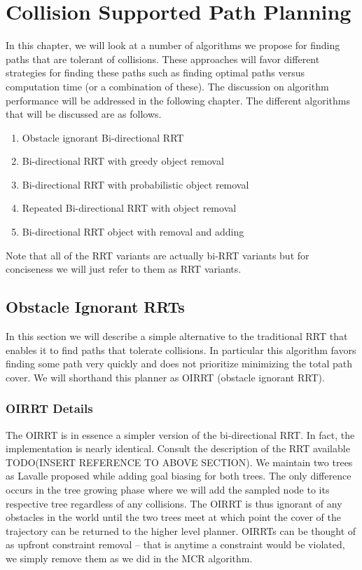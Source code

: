 \chapter{Collision Supported Path Planning}
In this chapter, we will look at a number of algorithms we propose for finding paths that are tolerant of collisions. These approaches will favor different strategies for finding these paths such as finding optimal paths versus computation time (or a combination of these). The discussion on algorithm performance will be addressed in the following chapter. The different algorithms that will be discussed are as follows.

\begin{enumerate}
\item Obstacle ignorant Bi-directional RRT
\item Bi-directional RRT with greedy object removal
\item Bi-directional RRT with probabilistic object removal
\item Repeated Bi-directional RRT with object removal
\item Bi-directional RRT object with removal and adding
\end{enumerate}

Note that all of the RRT variants are actually bi-RRT variants but for conciseness we will just refer to them as RRT variants.

\section{Obstacle Ignorant RRTs}
In this section we will describe a simple alternative to the traditional RRT that enables it to find paths that tolerate collisions. In particular this algorithm favors finding some path very quickly and does not prioritize minimizing the total path cover. We will shorthand this planner as OIRRT (obstacle ignorant RRT).

\subsection{OIRRT Details}
The OIRRT is in essence a simpler version of the bi-directional RRT. In fact, the implementation is nearly identical. Consult the description of the RRT available TODO(INSERT REFERENCE TO ABOVE SECTION). We maintain two trees as Lavalle proposed while adding goal biasing for both trees. The only difference occurs in the tree growing phase where we will add the sampled node to its respective tree regardless of any collisions. The OIRRT is thus ignorant of any obstacles in the world until the two trees meet at which point the cover of the trajectory can be returned to the higher level planner. OIRRTs can be thought of as upfront constraint removal -- that is anytime a constraint would be violated, we simply remove them as we did in the MCR algorithm. 

